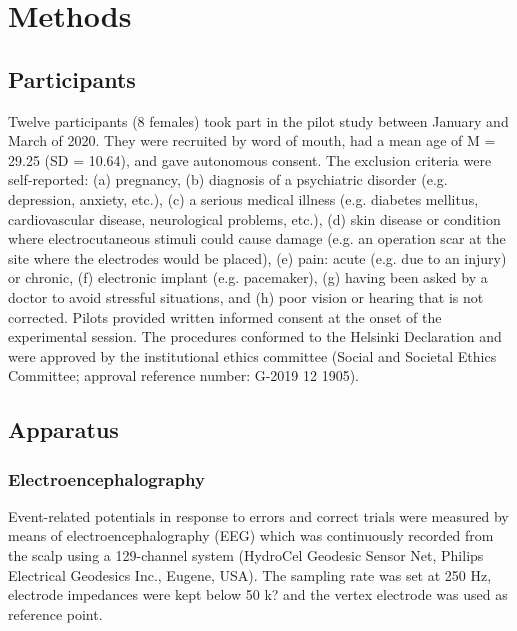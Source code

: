 \documentclass[twocolumn, serif, authordate, review]{jote-article}
\begin{document}
{}
\section*{Methods}  
\gotoreview
\label{sec:methods}

{} \subsection*{Participants}
\gotoreview
\label{sec:participants}

\noindent Twelve participants (8 females) took part in the pilot study between January and March of 2020. They were recruited by word of mouth, had a mean age of M = 29.25 (SD = 10.64), and gave autonomous consent. The exclusion criteria were self-reported: (a) pregnancy, (b) diagnosis of a psychiatric disorder (e.g. depression, anxiety, etc.), (c) a serious medical illness (e.g. diabetes mellitus, cardiovascular disease, neurological problems, etc.), (d) skin disease or condition where electrocutaneous stimuli could cause damage (e.g. an operation scar at the site where the electrodes would be placed), (e) pain: acute (e.g. due to an injury) or chronic, (f) electronic implant (e.g. pacemaker), (g) having been asked by a doctor to avoid stressful situations, and (h) poor vision or hearing that is not corrected. Pilots provided written informed consent at the onset of the experimental session. The procedures conformed to the Helsinki Declaration and were approved by the institutional ethics committee (Social and Societal Ethics Committee; approval reference number: G-2019 12 1905).~

{}
\subsection*{Apparatus}  

\subsubsection*{Electroencephalography}Event-related potentials in response to errors and correct trials were measured by means of electroencephalography (EEG) which was continuously recorded from the scalp using a 129-channel system (HydroCel Geodesic Sensor Net, Philips Electrical Geodesics Inc., Eugene, USA). The sampling rate was set at 250 Hz, electrode impedances were kept below 50 k? and the vertex electrode was used as reference point.
\end{document}
